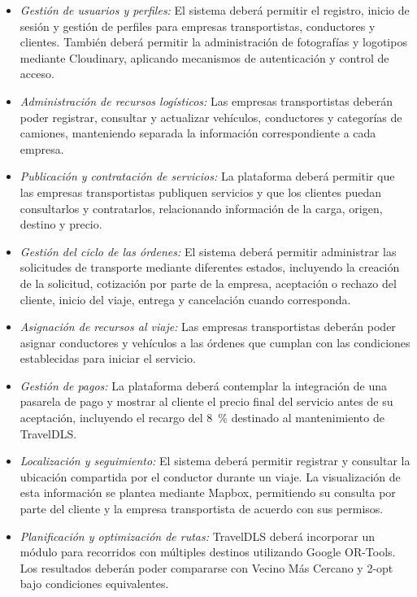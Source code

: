 \begin{itemize}
	
	\item \textit{Gestión de usuarios y perfiles:} El sistema deberá permitir el registro, inicio de sesión y gestión de perfiles para empresas transportistas, conductores y clientes. También deberá permitir la administración de fotografías y logotipos mediante Cloudinary, aplicando mecanismos de autenticación y control de acceso.
	
	\item \textit{Administración de recursos logísticos:} Las empresas transportistas deberán poder registrar, consultar y actualizar vehículos, conductores y categorías de camiones, manteniendo separada la información correspondiente a cada empresa.
	
	\item \textit{Publicación y contratación de servicios:} La plataforma deberá permitir que las empresas transportistas publiquen servicios y que los clientes puedan consultarlos y contratarlos, relacionando información de la carga, origen, destino y precio.
	
	\item \textit{Gestión del ciclo de las órdenes:} El sistema deberá permitir administrar las solicitudes de transporte mediante diferentes estados, incluyendo la creación de la solicitud, cotización por parte de la empresa, aceptación o rechazo del cliente, inicio del viaje, entrega y cancelación cuando corresponda.
	
	\item \textit{Asignación de recursos al viaje:} Las empresas transportistas deberán poder asignar conductores y vehículos a las órdenes que cumplan con las condiciones establecidas para iniciar el servicio.
	
	\item \textit{Gestión de pagos:} La plataforma deberá contemplar la integración de una pasarela de pago y mostrar al cliente el precio final del servicio antes de su aceptación, incluyendo el recargo del 8~\% destinado al mantenimiento de TravelDLS.
	
	\item \textit{Localización y seguimiento:} El sistema deberá permitir registrar y consultar la ubicación compartida por el conductor durante un viaje. La visualización de esta información se plantea mediante Mapbox, permitiendo su consulta por parte del cliente y la empresa transportista de acuerdo con sus permisos.
	
	\item \textit{Planificación y optimización de rutas:} TravelDLS deberá incorporar un módulo para recorridos con múltiples destinos utilizando Google OR-Tools. Los resultados deberán poder compararse con Vecino Más Cercano y 2-opt bajo condiciones equivalentes.
	
\end{itemize}

